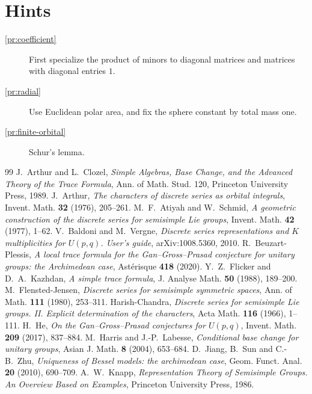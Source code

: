 \documentclass[reqno]{amsart}
\theoremstyle{definition}
\begin{document}
\section*{Hints}
\begin{description}
\item[\ref{pr:coefficient}] First specialize the product of minors to diagonal matrices and matrices with diagonal entries \(1\).
\item[\ref{pr:radial}] Use Euclidean polar area, and fix the sphere constant by total mass one.
\item[\ref{pr:finite-orbital}] Schur's lemma.
\end{description}

{\small
\begin{thebibliography}{99}
 J.~Arthur and L.~Clozel, \emph{Simple Algebras, Base Change, and the Advanced Theory of the Trace Formula}, Ann. of Math. Stud. 120, Princeton University Press, 1989.
 J.~Arthur, \emph{The characters of discrete series as orbital integrals}, Invent. Math. \textbf{32} (1976), 205--261.
 M.~F.~Atiyah and W.~Schmid, \emph{A geometric construction of the discrete series for semisimple Lie groups}, Invent. Math. \textbf{42} (1977), 1--62.
 V.~Baldoni and M.~Vergne, \emph{Discrete series representations and \(K\) multiplicities for \(U(p,q)\). User's guide}, arXiv:1008.5360, 2010.
 R.~Beuzart-Plessis, \emph{A local trace formula for the Gan--Gross--Prasad conjecture for unitary groups: the Archimedean case}, Ast\'erisque \textbf{418} (2020).
 Y.~Z.~Flicker and D.~A.~Kazhdan, \emph{A simple trace formula}, J. Analyse Math. \textbf{50} (1988), 189--200.
 M.~Flensted-Jensen, \emph{Discrete series for semisimple symmetric spaces}, Ann. of Math. \textbf{111} (1980), 253--311.
 Harish-Chandra, \emph{Discrete series for semisimple Lie groups. II. Explicit determination of the characters}, Acta Math. \textbf{116} (1966), 1--111.
 H.~He, \emph{On the Gan--Gross--Prasad conjectures for \(U(p,q)\)}, Invent. Math. \textbf{209} (2017), 837--884.
 M.~Harris and J.-P.~Labesse, \emph{Conditional base change for unitary groups}, Asian J. Math. \textbf{8} (2004), 653--684.
 D.~Jiang, B.~Sun and C.-B.~Zhu, \emph{Uniqueness of Bessel models: the archimedean case}, Geom. Funct. Anal. \textbf{20} (2010), 690--709.
 A.~W.~Knapp, \emph{Representation Theory of Semisimple Groups. An Overview Based on Examples}, Princeton University Press, 1986.

\end{thebibliography}}
\end{document}
